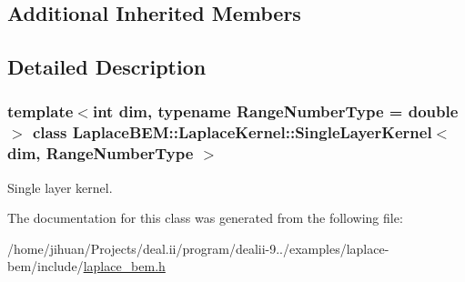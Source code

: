 \subsection*{Additional Inherited Members}


\subsection{Detailed Description}
\subsubsection*{template$<$int dim, typename Range\+Number\+Type = double$>$\newline
class Laplace\+B\+E\+M\+::\+Laplace\+Kernel\+::\+Single\+Layer\+Kernel$<$ dim, Range\+Number\+Type $>$}

Single layer kernel. 

The documentation for this class was generated from the following file\+:\begin{DoxyCompactItemize}
\item 
/home/jihuan/\+Projects/deal.\+ii/program/dealii-\/9../examples/laplace-\/bem/include/\hyperlink{laplace__bem_8h}{laplace\+\_\+bem.\+h}\end{DoxyCompactItemize}

